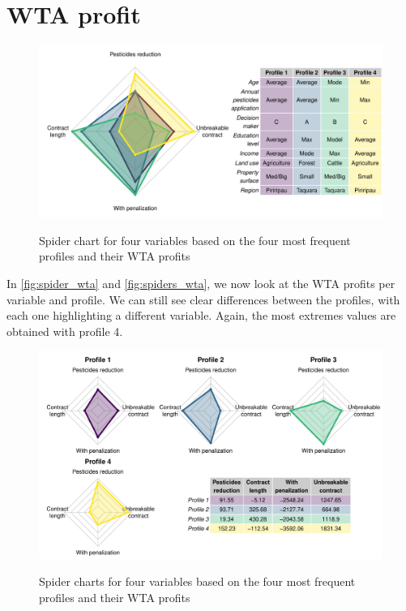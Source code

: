 \documentclass[12pt]{article}
\begin{document}
\section*{WTA profit}

\begin{figure}[H]
 \centering
 \includegraphics[width=\textwidth]{figures/spider_wta.pdf}\\
 \caption{Spider chart for four variables based on the four most
          frequent profiles and their WTA profits}
 \label{fig:spider_wta}
\end{figure}

In \autoref{fig:spider_wta} and \autoref{fig:spiders_wta}, we now look
at the WTA profits per variable and profile. We can still see clear
differences between the profiles, with each one highlighting a different
variable. Again, the most extremes values are obtained with profile 4.

\begin{figure}[H]
 \centering
 \includegraphics[width=\textwidth]{figures/spiders_wta.pdf}\\
 \caption{Spider charts for four variables based on the four most
          frequent profiles and their WTA profits}
 \label{fig:spiders_wta}
\end{figure}
\end{document}
